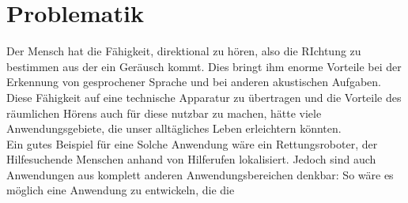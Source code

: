 \section{Problematik}
Der Mensch hat die Fähigkeit, direktional zu hören, also die RIchtung zu bestimmen aus der ein Geräusch kommt. Dies bringt ihm enorme Vorteile bei der Erkennung von gesprochener Sprache und bei anderen akustischen Aufgaben. Diese Fähigkeit auf eine technische Apparatur zu übertragen und die Vorteile des räumlichen Hörens auch für diese nutzbar zu machen, hätte viele Anwendungsgebiete, die unser alltägliches Leben erleichtern könnten.\\
Ein gutes Beispiel für eine Solche Anwendung wäre ein Rettungsroboter, der Hilfesuchende Menschen anhand von Hilferufen lokalisiert.
Jedoch sind auch Anwendungen aus komplett anderen Anwendungsbereichen denkbar: So wäre es möglich eine Anwendung zu entwickeln, die die 
